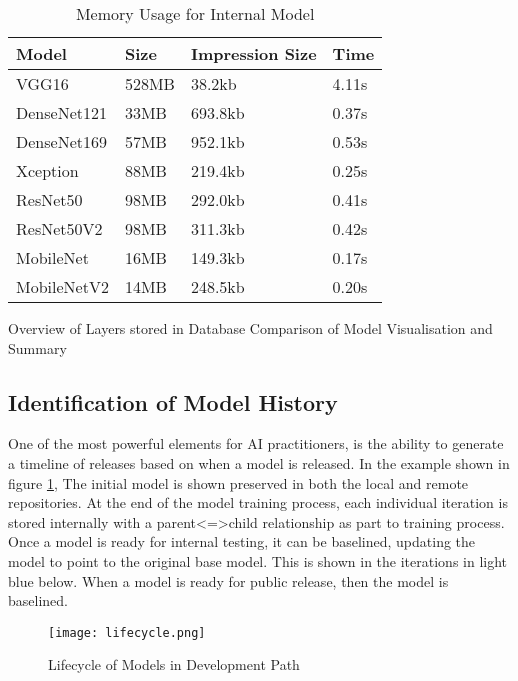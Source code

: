 \begin{table}[!ht]
    \centering
    \caption{Memory Usage for Internal Model}
    \label{table:memory}
    \setlength\tabcolsep{0pt} %
    \begin{tabular}{@{} p{2cm} p{2cm} p{2cm} p{1cm}  @{}}
        \hline
        Model & Size & Impression Size & Time\\
        \hline
        VGG16       & 528MB & 38.2kb & 4.11s \\
        DenseNet121	& 33MB & 693.8kb & 0.37s \\
        DenseNet169	& 57MB & 952.1kb & 0.53s \\
        Xception	& 88MB & 219.4kb & 0.25s \\
        ResNet50	& 98MB & 292.0kb & 0.41s \\
        ResNet50V2	& 98MB & 311.3kb & 0.42s \\
        MobileNet	& 16MB & 149.3kb & 0.17s \\
        MobileNetV2	& 14MB & 248.5kb & 0.20s \\
        \hline
    \end{tabular}
\end{table}

    Overview of Layers stored in Database
    Comparison of Model Visualisation and Summary

\subsection{Identification of Model History}

One of the most powerful elements for AI practitioners, is the ability to generate a timeline of releases based on when a model is released. In the example shown in figure \ref{fig:lifecycle_in real}, The initial model is shown preserved in both the local and remote repositories. At the end of the model training process, each individual iteration is stored internally with a parent<=>child relationship as part to training process. Once a model is ready for internal testing, it can be baselined, updating the model to point to the original base model. This is shown in the iterations in light blue below. When a model is ready for public release, then the model is baselined.

\begin{figure}[!ht]
    \centering
    \texttt{[image: lifecycle.png]}
    \caption{Lifecycle of Models in Development Path}
    \label{fig:lifecycle_in real}
\end{figure}

